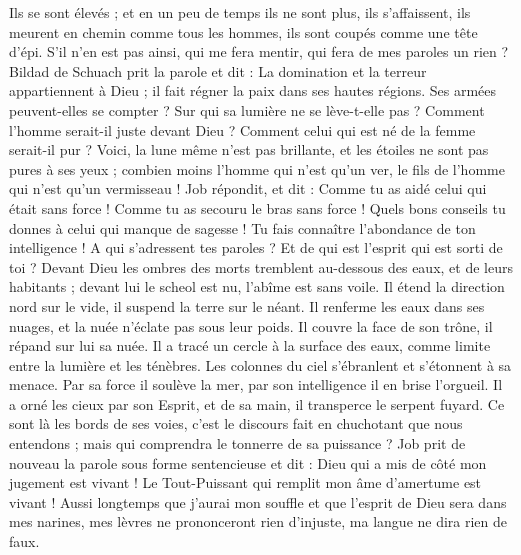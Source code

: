 \begin{multicols}{2}
Ils se sont élevés ; et en un peu de temps ils ne sont plus, ils s'affaissent, ils meurent en chemin comme tous les hommes, ils sont coupés comme une tête d'épi.
S'il n'en est pas ainsi, qui me fera mentir, qui fera de mes paroles un rien ?
\VerseOne{}Bildad de Schuach prit la parole et dit :
La domination et la terreur appartiennent à Dieu ; il fait régner la paix dans ses hautes régions.
Ses armées peuvent-elles se compter ? Sur qui sa lumière ne se lève-t-elle pas ?
Comment l'homme serait-il juste devant Dieu ? Comment celui qui est né de la femme serait-il pur ?
Voici, la lune même n'est pas brillante, et les étoiles ne sont pas pures à ses yeux ;
combien moins l'homme qui n'est qu'un ver, le fils de l'homme qui n'est qu'un vermisseau !
\VerseOne{}Job répondit, et dit :
Comme tu as aidé celui qui était sans force ! Comme tu as secouru le bras sans force !
Quels bons conseils tu donnes à celui qui manque de sagesse ! Tu fais connaître l'abondance de ton intelligence !
A qui s'adressent tes paroles ? Et de qui est l'esprit qui est sorti de toi ?
Devant Dieu les ombres des morts tremblent au-dessous des eaux, et de leurs habitants ;
devant lui le scheol est nu, l'abîme est sans voile.
Il étend la direction nord sur le vide, il suspend la terre sur le néant.
Il renferme les eaux dans ses nuages, et la nuée n'éclate pas sous leur poids.
Il couvre la face de son trône, il répand sur lui sa nuée.
Il a tracé un cercle à la surface des eaux, comme limite entre la lumière et les ténèbres.
Les colonnes du ciel s'ébranlent et s'étonnent à sa menace.
Par sa force il soulève la mer, par son intelligence il en brise l'orgueil.
Il a orné les cieux par son Esprit, et  de sa main, il transperce le serpent fuyard.
Ce sont là les bords de ses voies, c'est le discours fait en chuchotant que nous entendons ; mais qui comprendra le tonnerre de sa puissance ?
\VerseOne{}Job prit de nouveau la parole sous forme sentencieuse et dit :
Dieu qui a mis de côté mon jugement est vivant ! Le Tout-Puissant qui remplit mon âme d'amertume est vivant !
Aussi longtemps que j'aurai mon souffle et que l'esprit de Dieu sera dans mes narines,
mes lèvres ne prononceront rien d'injuste, ma langue ne dira rien de faux.

\end{multicols}
